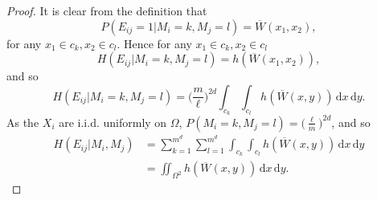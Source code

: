 \documentclass[10pt,a4paper]{amsart}
\newcommand{\K}{\Omega}
\newcommand{\dd}{\,\mathrm{d}}
\newcommand{\ol}[1]{\overline{#1}}
\begin{document}
\begin{proof}
It is clear from the definition that
\begin{equation}P(E_{ij}=1|M_i=k, M_j=l) = \ol{W}(x_1,x_2),\end{equation}
for any $x_1\in c_k, x_2\in c_l$. Hence for any $x_1\in c_k, x_2\in c_l$
\begin{equation}
H(E_{ij}|M_i = k, M_j = l) = h(\ol{W}(x_1,x_2)),
\end{equation}
and so
\[
H(E_{ij}|M_i=k,M_j=l) = \Big(\frac{m}{\ell}\Big)^{2d}\int_{c_k}\int_{c_l}h(\ol{W}(x,y))\dd x\dd y.
\]
As the $X_i$ are i.i.d. uniformly on $\K$, $P(M_i = k, M_j=l) = \Big(\frac{\ell}{m}\Big)^{2d}$, and so
\begin{align}
H(E_{ij}|M_i,M_j) &=\sum_{k=1}^{m^d}\sum_{l=1}^{m^d}\int_{c_k}\int_{c_l}h(\ol{W}(x,y))\dd x\dd y\\
&= \iint_{\K^2}h(\ol{W}(x,y))\dd x\dd y.
\end{align}
\end{proof}
\end{document}
